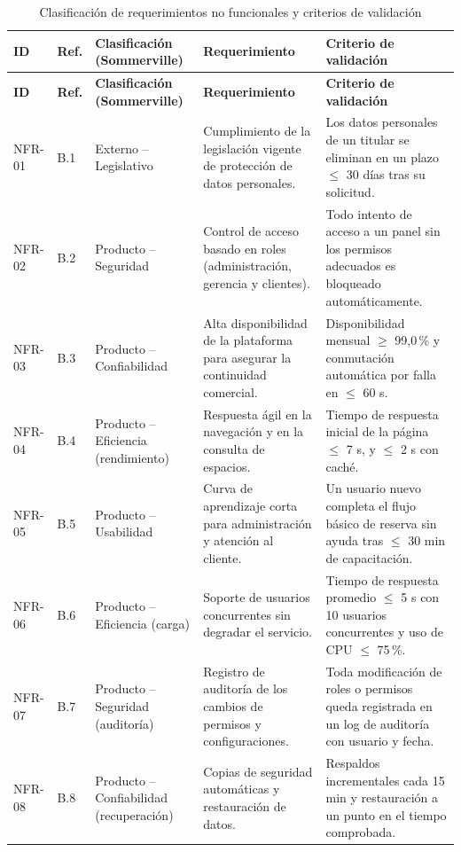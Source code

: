 \documentclass[12pt,a4paper]{article}
\begin{document}
\begin{longtable}{@{}p{1.45cm} p{0.9cm} p{2.7cm} p{4.0cm} p{4.6cm}@{}}
\caption{Clasificaci\'on de requerimientos no funcionales y criterios de validaci\'on}\label{tab:nofuncionales}\\
\toprule
\textbf{ID} & \textbf{Ref.} & \textbf{Clasificaci\'on (Sommerville)} & \textbf{Requerimiento} & \textbf{Criterio de validaci\'on} \\
\midrule
\endfirsthead
\toprule
\textbf{ID} & \textbf{Ref.} & \textbf{Clasificaci\'on (Sommerville)} & \textbf{Requerimiento} & \textbf{Criterio de validaci\'on} \\
\midrule
\endhead
\bottomrule
\endfoot
NFR-01 & B.1 & Externo -- Legislativo & Cumplimiento de la legislaci\'on vigente de protecci\'on de datos personales. & Los datos personales de un titular se eliminan en un plazo $\leq$ 30 d\'ias tras su solicitud. \\
NFR-02 & B.2 & Producto -- Seguridad & Control de acceso basado en roles (administraci\'on, gerencia y clientes). & Todo intento de acceso a un panel sin los permisos adecuados es bloqueado autom\'aticamente. \\
NFR-03 & B.3 & Producto -- Confiabilidad & Alta disponibilidad de la plataforma para asegurar la continuidad comercial. & Disponibilidad mensual $\geq$ 99,0\,\% y conmutaci\'on autom\'atica por falla en $\leq$ 60 s. \\
NFR-04 & B.4 & Producto -- Eficiencia (rendimiento) & Respuesta \'agil en la navegaci\'on y en la consulta de espacios. & Tiempo de respuesta inicial de la p\'agina $\leq$ 7 s, y $\leq$ 2 s con cach\'e. \\
NFR-05 & B.5 & Producto -- Usabilidad & Curva de aprendizaje corta para administraci\'on y atenci\'on al cliente. & Un usuario nuevo completa el flujo b\'asico de reserva sin ayuda tras $\leq$ 30 min de capacitaci\'on. \\
NFR-06 & B.6 & Producto -- Eficiencia (carga) & Soporte de usuarios concurrentes sin degradar el servicio. & Tiempo de respuesta promedio $\leq$ 5 s con 10 usuarios concurrentes y uso de CPU $\leq$ 75\,\%. \\
NFR-07 & B.7 & Producto -- Seguridad (auditor\'ia) & Registro de auditor\'ia de los cambios de permisos y configuraciones. & Toda modificaci\'on de roles o permisos queda registrada en un log de auditor\'ia con usuario y fecha. \\
NFR-08 & B.8 & Producto -- Confiabilidad (recuperaci\'on) & Copias de seguridad autom\'aticas y restauraci\'on de datos. & Respaldos incrementales cada 15 min y restauraci\'on a un punto en el tiempo comprobada. \\

\end{longtable}
\end{document}
